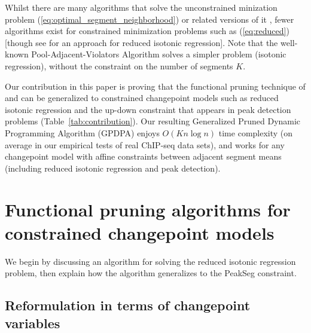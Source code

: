 \documentclass[aoas]{imsart}
\begin{document}
Whilst there are many algorithms that solve the unconstrained
minization problem (\ref{eq:optimal_segment_neighborhood})
\citep{segment-neighborhood,pruned-dp,phd-johnson} or related versions
of it \citep{optimal-partitioning,pelt,fpop,flsa}, fewer algorithms
exist for constrained minimization problems such as (\ref{eq:reduced})
[though see \citet{hardwick2014optimal} for an approach for reduced
isotonic regression]. Note that the well-known Pool-Adjacent-Violators
Algorithm \citep{mair2009isotone} solves a simpler problem (isotonic
regression), without the constraint on the number of segments $K$.

Our contribution in this paper is proving
that the functional pruning technique of \citet{pruned-dp} and
\citet{fpop} can be generalized to constrained changepoint models such
as reduced isotonic regression and the up-down constraint that appears
in peak detection problems (Table~\ref{tab:contribution}). Our
resulting Generalized Pruned Dynamic Programming Algorithm (GPDPA)
enjoys $O(Kn\log n)$ time complexity (on average in our empirical
tests of real ChIP-seq data sets), and works for any changepoint model
with affine constraints between adjacent segment means (including
reduced isotonic regression and peak detection).

\newcommand{\FCC}{C}
\newcommand{\M}{\mathcal{M}}
\section{Functional 
pruning algorithms for constrained
  changepoint models}
\label{sec:algorithms}



We begin by discussing an algorithm for solving the reduced isotonic
regression problem, then explain how the algorithm generalizes to
the PeakSeg constraint.

\subsection{Reformulation in terms of changepoint variables}
\end{document}
